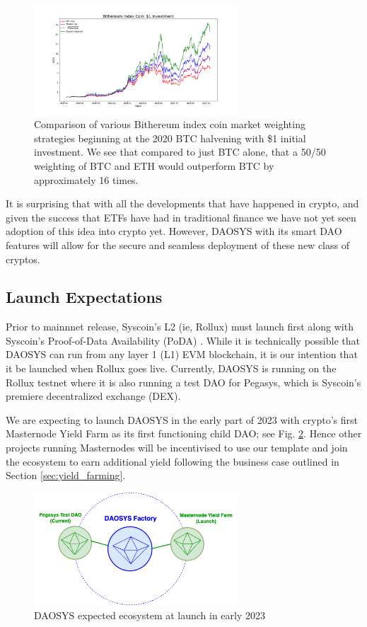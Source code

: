 \documentclass[journal,twocolumn,12pt]{ieeesyscoin}
\begin{document}
\begin{figure}[h!]
\includegraphics[width=3in]{img/index_coin.png}
\caption{Comparison of various Bithereum index coin market weighting strategies beginning at the 2020 BTC halvening with \$1 initial investment. We see that compared to just BTC alone, that a 50/50 weighting of BTC and ETH would outperform BTC by approximately 16 times.} 
\label{fig:crypto_index}
\end{figure} 

It is surprising that with all the developments that have happened in crypto, and given the success that ETFs have had in traditional finance we have not yet seen adoption of this idea into crypto yet. However, DAOSYS with its smart DAO features will allow for the secure and seamless deployment of these new class of cryptos.  

\subsection{Launch Expectations}

Prior to mainnnet release, Syscoin's L2 (ie, Rollux) \cite{ROL22, Sig21a, Sig21b} must launch first along with Syscoin's Proof-of-Data Availability (PoDA) \cite{PODA22}. While it is technically possible that DAOSYS can run from any layer 1 (L1) EVM blockchain, it is our intention that it be launched when Rollux goes live. Currently, DAOSYS is running on the Rollux testnet where it is also running a test DAO for Pegasys, which is Syscoin's premiere decentralized exchange (DEX). 

We are expecting to launch DAOSYS in the early part of 2023 with crypto's first Masternode Yield Farm as its first functioning child DAO; see Fig. \ref{fig:daosys_launch}. Hence other projects running Masternodes will be incentivised to use our template and join the ecosystem to earn additional yield following the business case outlined in Section \ref{sec:yield_farming}.

\begin{figure}[h!]
\includegraphics[width=3in]{img/daosys_launch.png}
\caption{DAOSYS expected ecosystem at launch in early 2023} 
\label{fig:daosys_launch}
\end{figure} 
\end{document}
